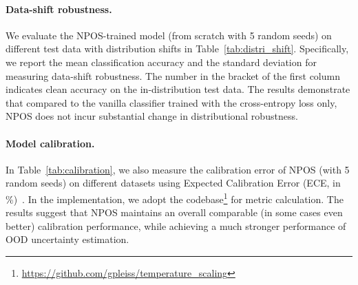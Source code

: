 \paragraph{Data-shift robustness.} We evaluate the NPOS-trained model (from scratch with 5 random seeds) on different test data with distribution shifts in Table~\ref{tab:distri_shift}. Specifically, we report the mean classification accuracy and the standard deviation for measuring data-shift robustness. The number in the bracket of the first column indicates clean accuracy on the in-distribution test data. The results demonstrate that compared to the vanilla classifier trained with the cross-entropy loss only, NPOS does not incur substantial change in distributional robustness.
\begin{table}[h]
    \centering
    \small 
    \caption{Evaluations on data-shift robustness (numbers are in \%).}
      \label{tab:distri_shift}\vspace{-1em}
  \end{table}


\vspace{-0.3cm}
\paragraph{Model calibration.} In Table~\ref{tab:calibration}, we also measure the calibration error of NPOS (with 5 random seeds) on different datasets using Expected Calibration Error (ECE, in \%)~\citep{guo2017calibration}. In the implementation, we adopt the codebase\footnote{\url{https://github.com/gpleiss/temperature_scaling}} for metric calculation. The results suggest that NPOS maintains an overall comparable (in some cases even better) calibration performance, while achieving a much stronger performance of OOD uncertainty estimation.

